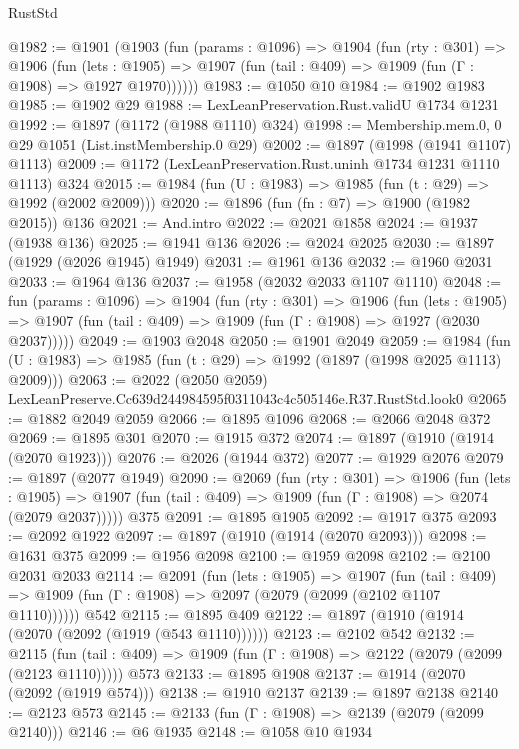 \begin{lexlean}{RustStd}
\begin{coremodule}
@1982 := @1901
    (@1903
      (fun (params : @1096) =>
      @1904
        (fun (rty : @301) =>
        @1906
          (fun (lets : @1905) =>
          @1907 (fun (tail : @409) => @1909 (fun (Γ : @1908) => @1927 @1970))))))
@1983 := @1050 @10
@1984 := @1902 @1983
@1985 := @1902 @29
@1988 := LexLeanPreservation.Rust.validU @1734 @1231
@1992 := @1897 (@1172 (@1988 @1110) @324)
@1998 := Membership.mem.{0, 0} @29 @1051 (List.instMembership.{0} @29)
@2002 := @1897 (@1998 (@1941 @1107) @1113)
@2009 := @1172 (LexLeanPreservation.Rust.uninh @1734 @1231 @1110 @1113) @324
@2015 := @1984 (fun (U : @1983) => @1985 (fun (t : @29) => @1992 (@2002 @2009)))
@2020 := @1896 (fun (fn : @7) => @1900 (@1982 @2015)) @136
@2021 := And.intro
@2022 := @2021 @1858
@2024 := @1937 (@1938 @136)
@2025 := @1941 @136
@2026 := @2024 @2025
@2030 := @1897 (@1929 (@2026 @1945) @1949)
@2031 := @1961 @136
@2032 := @1960 @2031
@2033 := @1964 @136
@2037 := @1958 (@2032 @2033 @1107 @1110)
@2048 := fun (params : @1096) =>
  @1904
    (fun (rty : @301) =>
    @1906
      (fun (lets : @1905) =>
      @1907 (fun (tail : @409) => @1909 (fun (Γ : @1908) => @1927 (@2030 @2037)))))
@2049 := @1903 @2048
@2050 := @1901 @2049
@2059 := @1984 (fun (U : @1983) => @1985 (fun (t : @29) => @1992 (@1897 (@1998 @2025 @1113) @2009)))
@2063 := @2022 (@2050 @2059) LexLeanPreserve.Cc639d244984595f0311043c4c505146e.R37.RustStd.look0
@2065 := @1882 @2049 @2059
@2066 := @1895 @1096
@2068 := @2066 @2048 @372
@2069 := @1895 @301
@2070 := @1915 @372
@2074 := @1897 (@1910 (@1914 (@2070 @1923)))
@2076 := @2026 (@1944 @372)
@2077 := @1929 @2076
@2079 := @1897 (@2077 @1949)
@2090 := @2069
    (fun (rty : @301) =>
    @1906
      (fun (lets : @1905) =>
      @1907 (fun (tail : @409) => @1909 (fun (Γ : @1908) => @2074 (@2079 @2037)))))
    @375
@2091 := @1895 @1905
@2092 := @1917 @375
@2093 := @2092 @1922
@2097 := @1897 (@1910 (@1914 (@2070 @2093)))
@2098 := @1631 @375
@2099 := @1956 @2098
@2100 := @1959 @2098
@2102 := @2100 @2031 @2033
@2114 := @2091
    (fun (lets : @1905) =>
    @1907
      (fun (tail : @409) => @1909 (fun (Γ : @1908) => @2097 (@2079 (@2099 (@2102 @1107 @1110))))))
    @542
@2115 := @1895 @409
@2122 := @1897 (@1910 (@1914 (@2070 (@2092 (@1919 (@543 @1110))))))
@2123 := @2102 @542
@2132 := @2115
    (fun (tail : @409) => @1909 (fun (Γ : @1908) => @2122 (@2079 (@2099 (@2123 @1110)))))
    @573
@2133 := @1895 @1908
@2137 := @1914 (@2070 (@2092 (@1919 @574)))
@2138 := @1910 @2137
@2139 := @1897 @2138
@2140 := @2123 @573
@2145 := @2133 (fun (Γ : @1908) => @2139 (@2079 (@2099 @2140)))
@2146 := @6 @1935
@2148 := @1058 @10 @1934

\end{coremodule}
\end{lexlean}
